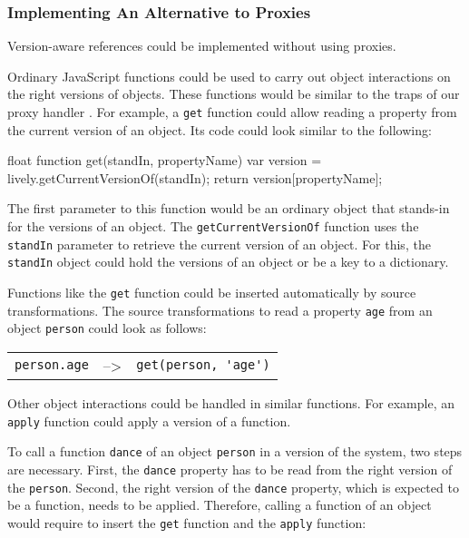 \subsubsection{Implementing An Alternative to Proxies}

Version-aware references could be implemented without using proxies.

Ordinary JavaScript functions could be used to carry out object interactions on the right versions of objects.
These functions would be similar to the traps of our proxy handler .
For example, a \lstinline{get} function could allow reading a property from the current version of an object.
Its code could look similar to the following:

\iffalse
\begin{verbatim}\fi
\begin{code}{}{float}
function get(standIn, propertyName) {
    var version = lively.getCurrentVersionOf(standIn);
    return version[propertyName];
}
\end{code}
\iffalse
\end{verbatim}\fi

The first parameter to this function would be an ordinary object that stands-in for the versions of an object.
The \lstinline{getCurrentVersionOf} function uses the \lstinline{standIn} parameter to retrieve the current version of an object.
For this, the \lstinline{standIn} object could hold the versions of an object or be a key to a dictionary.

Functions like the \lstinline{get} function could be inserted automatically by source transformations.
The source transformations to read a property \lstinline{age} from an object \lstinline{person} could look as follows:

\begin{center}
    \begin{tabular}{ lll }
    \lstinline|person.age| & --> & \lstinline|get(person, 'age')| \\
    \end{tabular}
\end{center}

Other object interactions could be handled in similar functions.
For example, an \lstinline{apply} function could apply a version of a function.

To call a function \lstinline{dance} of an object \lstinline{person} in a version of the system, two steps are necessary.
First, the \lstinline{dance} property has to be read from the right version of the \lstinline{person}.
Second, the right version of the \lstinline{dance} property, which is expected to be a function, needs to be applied.
Therefore, calling a function of an object would require to insert the \lstinline{get} function and the \lstinline{apply} function:

